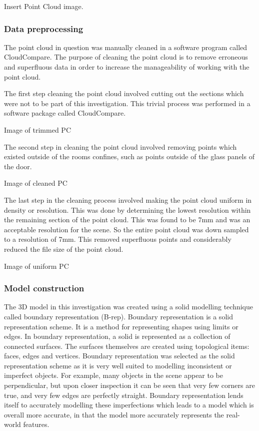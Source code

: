 \documentclass[11pt,a4paper]{report}
\begin{document}
				{{Insert Point Cloud image}}.
				
			\subsubsection{Data preprocessing}
				The point cloud in question was manually cleaned in a software program called CloudCompare. The purpose of cleaning the point cloud is to remove erroneous and superfluous data in order to increase the manageability of working with the point cloud.
	
				The first step cleaning the point cloud involved cutting out the sections which were not to be part of this investigation. This trivial process was performed in a software package called CloudCompare.
				
				{{Image of trimmed PC}}
				
				The second step in cleaning the point cloud involved removing points which existed outside of the rooms confines, such as points outside of the glass panels of the door.
				
				{{Image of cleaned PC}}
 
				The last step in the cleaning process involved making the point cloud uniform in density or resolution. This was done by determining the lowest resolution within the remaining section of the point cloud. This was found to be 7mm and was an acceptable resolution for the scene. So the entire point cloud was down sampled to a resolution of 7mm. This removed superfluous points and considerably reduced the file size of the point cloud.
				
				{{Image of uniform PC}}
			
			\subsubsection{Model construction}
				The 3D model in this investigation was created using a solid modelling technique called boundary representation (B-rep). Boundary representation is a solid representation scheme. It is a method for representing shapes using limits or edges. In boundary representation, a solid is represented as a collection of connected surfaces. The surfaces themselves are created using topological items: faces, edges and vertices.
				\cite{hongxin_zhang_introduction_2007}
				Boundary representation was selected as the solid representation scheme as it is very well suited to modelling inconsistent or imperfect objects. For example, many objects in the scene appear to be perpendicular, but upon closer inspection it can be seen that very few corners are true, and very few edges are perfectly straight. Boundary representation lends itself to accurately modelling these imperfections which leads to a model which is overall more accurate, in that the model more accurately represents the real-world features.
				
\end{document}
